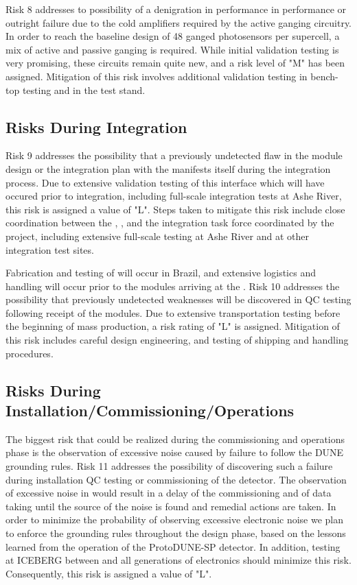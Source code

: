 Risk 8 addresses to possibility of a denigration in performance in  performance or outright failure due to the cold amplifiers required by the active ganging circuitry.  In order to reach the baseline design of 48 ganged photosensors per  supercell, a mix of active and passive ganging is required.  While initial validation testing is very promising, these circuits remain quite new, and a risk level of "M" has been assigned.  Mitigation of this risk involves additional validation testing in bench-top testing and in the  test stand.

\subsection{Risks During Integration}

Risk 9 addresses the possibility that a previously undetected flaw in the  module design or the integration plan with the  manifests itself during the integration process.  Due to extensive validation testing of this interface which will have occured prior to integration, including full-scale integration tests at Ashe River, this risk is assigned a value of "L".  Steps taken to mitigate this risk include close coordination between the , ,  and the integration task force coordinated by the project, including extensive full-scale testing at Ashe River and at other integration test sites.

Fabrication and testing of  will occur in Brazil, and extensive logistics and handling will occur prior to the modules arriving at the .  Risk 10 addresses the possibility that previously undetected weaknesses will be discovered in QC testing following receipt of the modules.  Due to extensive transportation testing before the beginning of mass production, a risk rating of "L" is assigned.  Mitigation of this risk includes careful design engineering, and testing of shipping and handling procedures.


\subsection{Risks During Installation/Commissioning/Operations}

The biggest risk that could be realized during the commissioning and operations phase is
the observation of excessive noise caused by failure to follow the DUNE
grounding rules.  Risk 11 addresses the possibility of discovering such a failure during installation QC testing or commissioning of the detector.  The observation of excessive noise in 
would result in a delay of the commissioning and of data taking until the source of the noise is
found and remedial actions are taken. In order to minimize the probability of observing excessive
electronic noise we plan to enforce the grounding rules throughout the design phase, based on
the lessons learned from the operation of the ProtoDUNE-SP detector.  In addition, testing at ICEBERG between  and all generations of  electronics should minimize this risk.  Consequently, this risk is assigned a value of "L".  

